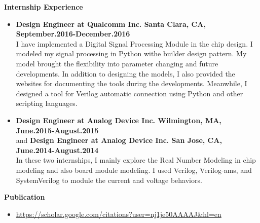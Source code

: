 \documentclass[]{article}
\begin{document}
\noindent \textbf{Internship Experience}
    \begin{itemize}
		\item \textbf{Design Engineer at Qualcomm Inc. Santa Clara, CA, September.2016-December.2016}\\
I have implemented a Digital Signal Processing Module in the chip design. I modeled my signal processing
in Python withe builder design pattern. My model brought the flexibility into parameter changing and 
future developments. In addition to designing the models, I also provided the websites for documenting the
tools during the developments. Meanwhile, I designed a tool for Verilog automatic connection using Python 
and other scripting languages.
        \item \textbf{Design Engineer at Analog Device Inc. Wilmington, MA, June.2015-August.2015}\\
        and \textbf{Design Engineer at Analog Device Inc. San Jose, CA, June.2014-August.2014}\\
In these two internships, I mainly explore the Real Number Modeling in chip modeling and also board 
module modeling. I used Verilog, Verilog-ams, and SystemVerilog to module the current and voltage 
behaviors. 
    \end{itemize}

% 
\noindent \textbf{Publication}
\begin{itemize}
\item\url{https://scholar.google.com/citations?user=nj1je50AAAAJ&hl=en}
\end{itemize}
%     
% 
% 
% 
% 
\end{document}
